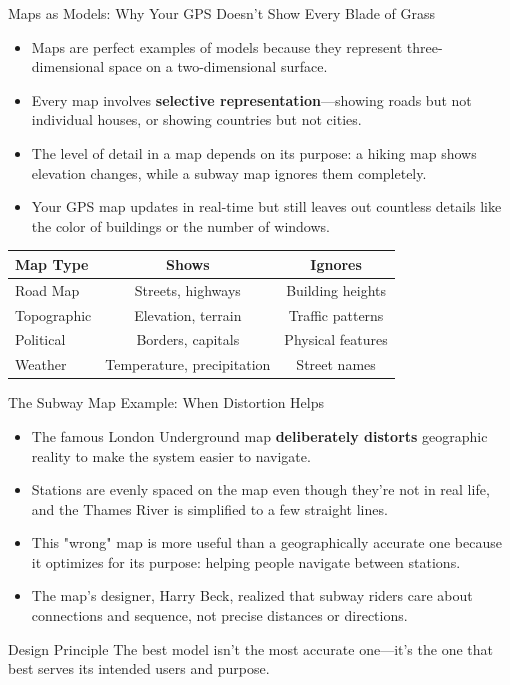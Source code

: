 \documentclass{beamer}
\begin{document}
	\begin{frame}{Maps as Models: Why Your GPS Doesn't Show Every Blade of Grass}
		\begin{itemize}
			\item Maps are perfect examples of models because they represent three-dimensional space on a two-dimensional surface.
			\item Every map involves \textbf{selective representation}—showing roads but not individual houses, or showing countries but not cities.
			\item The level of detail in a map depends on its purpose: a hiking map shows elevation changes, while a subway map ignores them completely.
			\item Your GPS map updates in real-time but still leaves out countless details like the color of buildings or the number of windows.
		\end{itemize}
		
		\begin{table}
			\centering
			\begin{tabular}{lcc}
				\toprule
				Map Type & Shows & Ignores \\
				\midrule
				Road Map & Streets, highways & Building heights \\
				Topographic & Elevation, terrain & Traffic patterns \\
				Political & Borders, capitals & Physical features \\
				Weather & Temperature, precipitation & Street names \\
				\bottomrule
			\end{tabular}
		\end{table}
	\end{frame}
	
	\begin{frame}{The Subway Map Example: When Distortion Helps}
		\begin{itemize}
			\item The famous London Underground map \textbf{deliberately distorts} geographic reality to make the system easier to navigate.
			\item Stations are evenly spaced on the map even though they're not in real life, and the Thames River is simplified to a few straight lines.
			\item This "wrong" map is more useful than a geographically accurate one because it optimizes for its purpose: helping people navigate between stations.
			\item The map's designer, Harry Beck, realized that subway riders care about connections and sequence, not precise distances or directions.
		\end{itemize}
		
		\begin{block}{Design Principle}
			The best model isn't the most accurate one—it's the one that best serves its intended users and purpose.
		\end{block}
	\end{frame}
	
\end{document}
